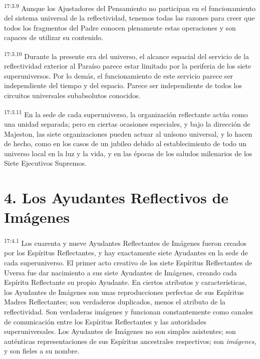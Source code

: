 \par
\textsuperscript{17:3.9} Aunque los Ajustadores del Pensamiento no participan en el funcionamiento del sistema universal de la reflectividad, tenemos todas las razones para creer que todos los fragmentos del Padre conocen plenamente estas operaciones y son capaces de utilizar su contenido.

\par
\textsuperscript{17:3.10} Durante la presente era del universo, el alcance espacial del servicio de la reflectividad exterior al Paraíso parece estar limitado por la periferia de los siete superuniversos. Por lo demás, el funcionamiento de este servicio parece ser independiente del tiempo y del espacio. Parece ser independiente de todos los circuitos universales subabsolutos conocidos.

\par
\textsuperscript{17:3.11} En la sede de cada superuniverso, la organización reflectante actúa como una unidad separada; pero en ciertas ocasiones especiales, y bajo la dirección de Majeston, las siete organizaciones pueden actuar al unísono universal, y lo hacen de hecho, como en los casos de un jubileo debido al establecimiento de todo un universo local en la luz y la vida, y en las épocas de los saludos milenarios de los Siete Ejecutivos Supremos.

\section*{4. Los Ayudantes Reflectivos de Imágenes}
\par
\textsuperscript{17:4.1} Los cuarenta y nueve Ayudantes Reflectantes de Imágenes fueron creados por los Espíritus Reflectantes, y hay exactamente siete Ayudantes en la sede de cada superuniverso. El primer acto creativo de los siete Espíritus Reflectantes de Uversa fue dar nacimiento a sus siete Ayudantes de Imágenes, creando cada Espíritu Reflectante su propio Ayudante. En ciertos atributos y características, los Ayudantes de Imágenes son unas reproducciones perfectas de sus Espíritus Madres Reflectantes; son verdaderos duplicados, menos el atributo de la reflectividad. Son verdaderas imágenes y funcionan constantemente como canales de comunicación entre los Espíritus Reflectantes y las autoridades superuniversales. Los Ayudantes de Imágenes no son simples asistentes; son auténticas representaciones de sus Espíritus ancestrales respectivos; son \textit{imágenes,} y son fieles a su nombre.

